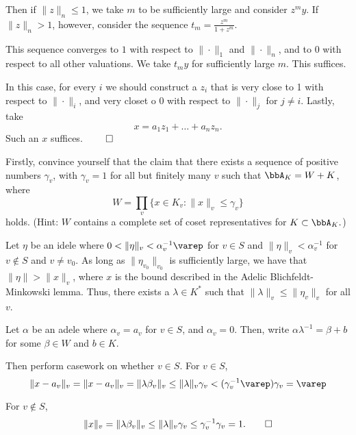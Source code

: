 \documentclass[a4paper, 12pt,oneside,openany]{book}
\begin{document}
Then if $\|z\|_n \leq 1$, we take $m$ to be sufficiently large and consider $z^my$. If $\|z\|_n > 1$, however, consider the sequence $t_m = \frac{z^m}{1+z^m}.$ 

This sequence converges to $1$ with respect to $\|\cdot \|_1$ and $\|\cdot \|_n$, and to 0 with respect to all other valuations. We take $t_m y$ for sufficiently large $m$. This suffices.

In this case, for every $i$ we should construct a $z_i$ that is very close to 1 with respect to $\| \cdot \|_i$, and very closet o $0$ with respect to $\|\cdot \|_j$ for $j\neq i$. Lastly, take $$x = a_1z_1+\dots+ a_nz_n.$$ Such an $x$ suffices. $\qed$ 


Firstly, convince yourself that the claim that there exists a sequence of positive numbers $\gamma_v$, with $\gamma_v = 1$ for all but finitely many $v$ such that $\bbA_K = W+K$, where $$W = \prod\limits_v \{x \in K_v: \|x\|_v \leq \gamma_v\}$$ holds. (Hint: $W$ contains a complete set of coset representatives for $K \subset \bbA_K.$)

Let $\eta$ be an idele where $0 < \| \eta\|_v < \alpha_v^{-1}\varep$ for $v \in S$ and $\| \eta\|_v < \alpha_v^{-1}$ for $v \not\in S$ and $v \neq v_0$. As long as $\| \eta_{v_0} \|_{v_0}$ is sufficiently large, we have that $\|\eta \| > \|x \|_v$, where $x$ is the bound described in the Adelic Blichfeldt-Minkowski lemma. Thus, there exists a $\lambda \in K^*$ such that $\| \lambda\|_v \leq \| \eta_v\| _v$ for all $v$. 

Let $\alpha$ be an adele where $\alpha_v = a_v$ for $v\in S$, and $\alpha_v =0$. Then, write $\alpha \lambda^{-1}=\beta+b$ for some $\beta \in W$ and $b \in K$. 

Then perform casework on whether $v \in S$. For $v \in S$, $$\|x-a_v\|_v = \|x-a_v\|_v = \|\lambda \beta_v\|_v \leq \|\lambda\|_v \gamma_v < (\gamma_v^{-1} \varep)\gamma_v = \varep$$

For $v \not\in S$, $$\|x\|_v = \|\lambda \beta_v\|_v \leq \|\lambda \|_v \gamma_v \leq \gamma_v^{-1}\gamma_v = 1. \qed$$

\end{document}
